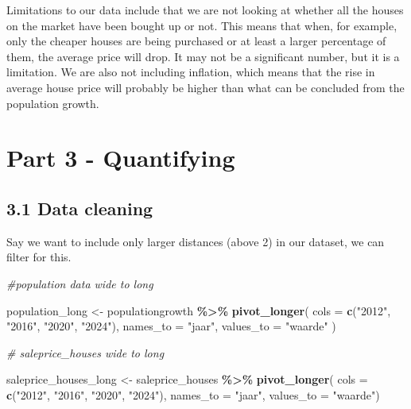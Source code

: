 \documentclass[
]{article}
\newenvironment{Shaded}{\begin{snugshade}}{\end{snugshade}}
\newcommand{\AttributeTok}[1]{\textcolor[rgb]{0.13,0.29,0.53}{#1}}
\newcommand{\CommentTok}[1]{\textcolor[rgb]{0.56,0.35,0.01}{\textit{#1}}}
\newcommand{\FunctionTok}[1]{\textcolor[rgb]{0.13,0.29,0.53}{\textbf{#1}}}
\newcommand{\NormalTok}[1]{#1}
\newcommand{\OtherTok}[1]{\textcolor[rgb]{0.56,0.35,0.01}{#1}}
\newcommand{\SpecialCharTok}[1]{\textcolor[rgb]{0.81,0.36,0.00}{\textbf{#1}}}
\newcommand{\StringTok}[1]{\textcolor[rgb]{0.31,0.60,0.02}{#1}}
\begin{document}
\hfill\break
Limitations to our data include that we are not looking at whether all
the houses on the market have been bought up or not. This means that
when, for example, only the cheaper houses are being purchased or at
least a larger percentage of them, the average price will drop. It may
not be a significant number, but it is a limitation. We are also not
including inflation, which means that the rise in average house price
will probably be higher than what can be concluded from the population
growth.

\section{Part 3 - Quantifying}\label{part-3---quantifying}

\subsection{3.1 Data cleaning}\label{data-cleaning}

Say we want to include only larger distances (above 2) in our dataset,
we can filter for this.

\begin{Shaded}
\begin{Highlighting}[]
\CommentTok{\#population data wide to long}

\NormalTok{population\_long }\OtherTok{\textless{}{-}}\NormalTok{ populationgrowth }\SpecialCharTok{\%\textgreater{}\%}
  \FunctionTok{pivot\_longer}\NormalTok{(}
    \AttributeTok{cols =} \FunctionTok{c}\NormalTok{(}\StringTok{"2012"}\NormalTok{, }\StringTok{"2016"}\NormalTok{, }\StringTok{"2020"}\NormalTok{, }\StringTok{"2024"}\NormalTok{),}
    \AttributeTok{names\_to =} \StringTok{"jaar"}\NormalTok{,}
    \AttributeTok{values\_to =} \StringTok{"waarde"}
\NormalTok{  )}

\CommentTok{\# saleprice\_houses wide to long}

\NormalTok{saleprice\_houses\_long }\OtherTok{\textless{}{-}}\NormalTok{ saleprice\_houses }\SpecialCharTok{\%\textgreater{}\%}
  \FunctionTok{pivot\_longer}\NormalTok{(}
    \AttributeTok{cols =} \FunctionTok{c}\NormalTok{(}\StringTok{"2012"}\NormalTok{, }\StringTok{"2016"}\NormalTok{, }\StringTok{"2020"}\NormalTok{, }\StringTok{"2024"}\NormalTok{),}
    \AttributeTok{names\_to =} \StringTok{"jaar"}\NormalTok{,}
    \AttributeTok{values\_to =} \StringTok{"waarde"}\NormalTok{)}
\end{Highlighting}
\end{Shaded}
\end{document}
